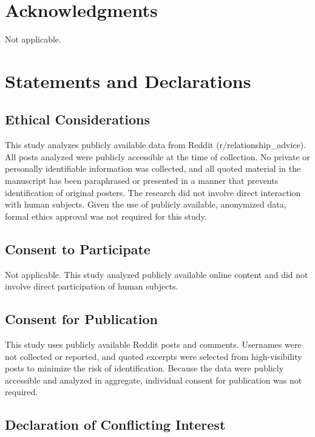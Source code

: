 \documentclass[12pt,a4paper]{article}
\begin{document}
\section*{Acknowledgments}

Not applicable.


\section*{Statements and Declarations}

\subsection*{Ethical Considerations}

This study analyzes publicly available data from Reddit (r/relationship\_advice). All posts analyzed were publicly accessible at the time of collection. No private or personally identifiable information was collected, and all quoted material in the manuscript has been paraphrased or presented in a manner that prevents identification of original posters. The research did not involve direct interaction with human subjects. Given the use of publicly available, anonymized data, formal ethics approval was not required for this study.

\subsection*{Consent to Participate}

Not applicable. This study analyzed publicly available online content and did not involve direct participation of human subjects.

\subsection*{Consent for Publication}

This study uses publicly available Reddit posts and comments. Usernames were not collected or reported, and quoted excerpts were selected from high-visibility posts to minimize the risk of identification. Because the data were publicly accessible and analyzed in aggregate, individual consent for publication was not required.

\subsection*{Declaration of Conflicting Interest}
\end{document}
